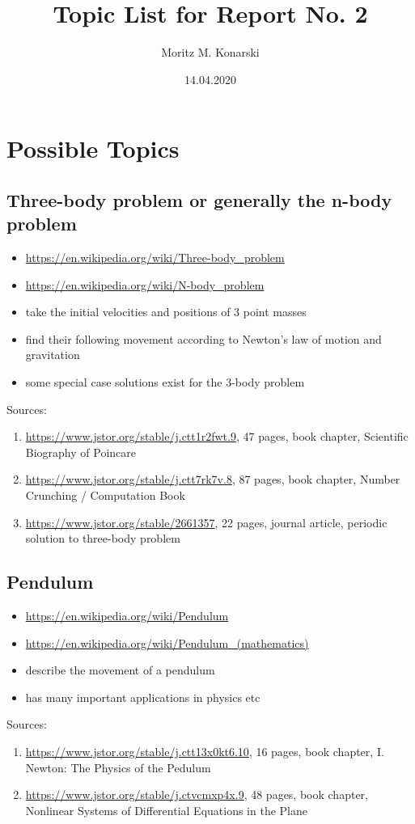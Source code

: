 \title{Topic List for Report No. 2}
\author{Moritz M. Konarski}
\date{14.04.2020}

\section{Possible Topics}

\subsection{Three-body problem or generally the n-body problem}
\begin{itemize}
    \item \url{https://en.wikipedia.org/wiki/Three-body_problem}
    \item \url{https://en.wikipedia.org/wiki/N-body_problem}
    \item take the initial velocities and positions of 3 point masses
    \item find their following movement according to Newton's law of
        motion and gravitation
    \item some special case solutions exist for the 3-body problem
\end{itemize}
Sources:
\begin{enumerate}
    \item \url{ https://www.jstor.org/stable/j.ctt1r2fwt.9}, 47 pages, book 
        chapter, Scientific Biography of Poincare
    \item \url{https://www.jstor.org/stable/j.ctt7rk7v.8}, 87 pages, book 
        chapter, Number Crunching / Computation Book
    \item \url{https://www.jstor.org/stable/2661357}, 22 pages, journal article,
        periodic solution to three-body problem
\end{enumerate}

\subsection{Pendulum}
\begin{itemize}
    \item \url{https://en.wikipedia.org/wiki/Pendulum}
    \item \url{https://en.wikipedia.org/wiki/Pendulum_(mathematics)}
    \item describe the movement of a pendulum
    \item has many important applications in physics etc
\end{itemize}
Sources:
\begin{enumerate}
    \item \url{https://www.jstor.org/stable/j.ctt13x0kt6.10}, 16 pages, book
        chapter, I. Newton: The Physics of the Pedulum
    \item \url{https://www.jstor.org/stable/j.ctvcmxp4x.9}, 48 pages, book
        chapter, Nonlinear Systems of Differential Equations in the Plane
\end{enumerate}

